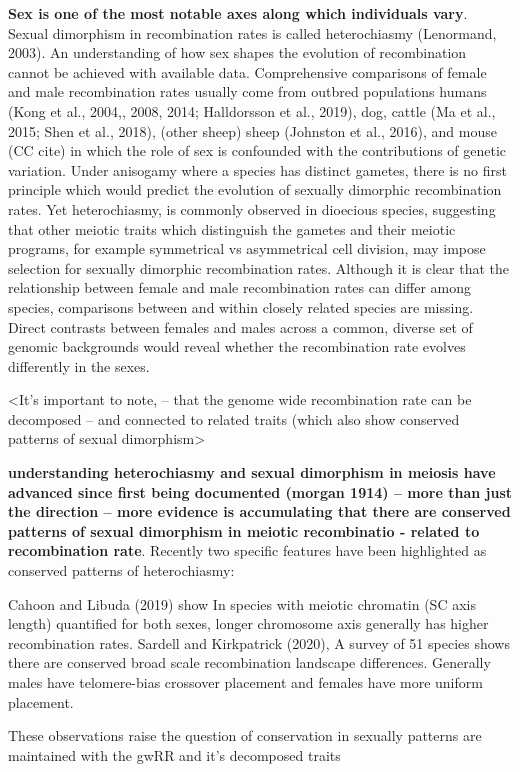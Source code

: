 \documentclass[
]{article}
\begin{document}
\textbf{Sex is one of the most notable axes along which individuals
vary}. Sexual dimorphism in recombination rates is called heterochiasmy
(Lenormand, 2003). An understanding of how sex shapes the evolution of
recombination cannot be achieved with available data. Comprehensive
comparisons of female and male recombination rates usually come from
outbred populations humans (Kong et al., 2004,, 2008, 2014; Halldorsson
et al., 2019), dog, cattle (Ma et al., 2015; Shen et al., 2018), (other
sheep) sheep (Johnston et al., 2016), and mouse (CC cite) in which the
role of sex is confounded with the contributions of genetic variation.
Under anisogamy where a species has distinct gametes, there is no first
principle which would predict the evolution of sexually dimorphic
recombination rates. Yet heterochiasmy, is commonly observed in
dioecious species, suggesting that other meiotic traits which
distinguish the gametes and their meiotic programs, for example
symmetrical vs asymmetrical cell division, may impose selection for
sexually dimorphic recombination rates. Although it is clear that the
relationship between female and male recombination rates can differ
among species, comparisons between and within closely related species
are missing. Direct contrasts between females and males across a common,
diverse set of genomic backgrounds would reveal whether the
recombination rate evolves differently in the sexes.

\textless It's important to note, -- that the genome wide recombination
rate can be decomposed -- and connected to related traits (which also
show conserved patterns of sexual dimorphism\textgreater{}

\textbf{understanding heterochiasmy and sexual dimorphism in meiosis
have advanced since first being documented (morgan 1914) -- more than
just the direction -- more evidence is accumulating that there are
conserved patterns of sexual dimorphism in meiotic recombinatio -
related to recombination rate}. Recently two specific features have been
highlighted as conserved patterns of heterochiasmy:

Cahoon and Libuda (2019) show In species with meiotic chromatin (SC axis
length) quantified for both sexes, longer chromosome axis generally has
higher recombination rates. Sardell and Kirkpatrick (2020), A survey of
51 species shows there are conserved broad scale recombination landscape
differences. Generally males have telomere-bias crossover placement and
females have more uniform placement.

These observations raise the question of conservation in sexually
patterns are maintained with the gwRR and it's decomposed traits
\end{document}
